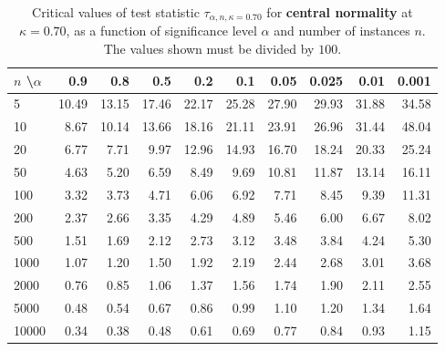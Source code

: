\documentclass[
  a4paper,
]{article}
\begin{document}
\begin{table}
\begin{center}
\caption{Critical values of test statistic $\tau_{\alpha, n, \kappa = 0.70}$ for
\textbf{central normality} at $\kappa = 0.70$, as a function of significance 
level $\alpha$ and number of instances $n$. The values shown must be divided by $100$.}
\label{tab:central-normality-critical-statistic}
\begin{tabular}{l | r r r r r r r r r}

\toprule
$n$ \textbackslash $\alpha$ & 0.9 & 0.8 & 0.5 & 0.2 & 0.1 & 0.05 & 0.025 & 0.01 & 0.001 \\

\midrule
5     & 10.49 & 13.15 & 17.46 & 22.17 & 25.28 & 27.90 & 29.93 & 31.88 & 34.58 \\
10    &  8.67 & 10.14 & 13.66 & 18.16 & 21.11 & 23.91 & 26.96 & 31.44 & 48.04 \\
20    &  6.77 &  7.71 &  9.97 & 12.96 & 14.93 & 16.70 & 18.24 & 20.33 & 25.24 \\
50    &  4.63 &  5.20 &  6.59 &  8.49 &  9.69 & 10.81 & 11.87 & 13.14 & 16.11 \\
100   &  3.32 &  3.73 &  4.71 &  6.06 &  6.92 &  7.71 &  8.45 &  9.39 & 11.31 \\
200   &  2.37 &  2.66 &  3.35 &  4.29 &  4.89 &  5.46 &  6.00 &  6.67 &  8.02 \\
500   &  1.51 &  1.69 &  2.12 &  2.73 &  3.12 &  3.48 &  3.84 &  4.24 &  5.30 \\
1000  &  1.07 &  1.20 &  1.50 &  1.92 &  2.19 &  2.44 &  2.68 &  3.01 &  3.68 \\
2000  &  0.76 &  0.85 &  1.06 &  1.37 &  1.56 &  1.74 &  1.90 &  2.11 &  2.55 \\
5000  &  0.48 &  0.54 &  0.67 &  0.86 &  0.99 &  1.10 &  1.20 &  1.34 &  1.64 \\
10000 &  0.34 &  0.38 &  0.48 &  0.61 &  0.69 &  0.77 &  0.84 &  0.93 &  1.15 \\
\bottomrule
\end{tabular}
\end{center}
\end{table}
\end{document}
